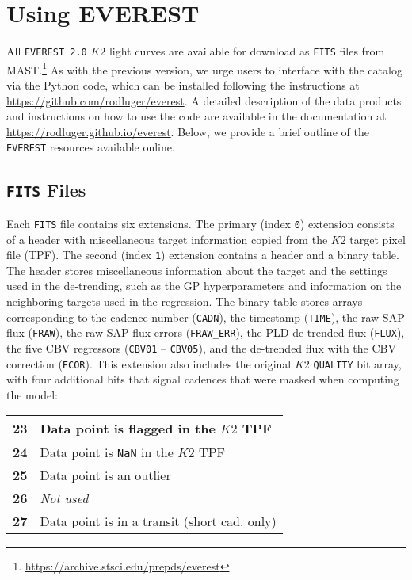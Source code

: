 \documentclass[]{emulateapj}
\newcommand{\edited}[1]{{\color{red} #1}}
\begin{document}
\section{Using EVEREST}
\label{sec:using}
All \texttt{EVEREST 2.0} $K2$ light curves are available for download as \texttt{FITS} files
from MAST.\footnote{\url{https://archive.stsci.edu/prepds/everest}} As with the
previous version, we urge users to interface with the catalog via the Python code,
which can be installed following the instructions at
\url{https://github.com/rodluger/everest}. \edited{A detailed description of the data products
and instructions on how to use the code are available in the documentation at
\url{https://rodluger.github.io/everest}.} Below, we provide
a brief outline of the \texttt{EVEREST} resources available online.

\subsection{\texttt{FITS} Files}
\label{sec:fits}
Each \texttt{FITS} file contains six extensions. The primary (index \texttt{0})
extension consists of a header with miscellaneous target information copied from
the $K2$ target pixel file (TPF). The second (index \texttt{1}) extension contains
a header and a binary table. The header stores miscellaneous
information about the target and the settings used in the de-trending, such as the
GP hyperparameters and information on the neighboring targets used in the regression.
The binary table stores arrays corresponding to the cadence number (\texttt{CADN}),
the timestamp (\texttt{TIME}), the raw SAP flux (\texttt{FRAW}), the raw SAP flux errors
(\texttt{FRAW\_ERR}), the PLD-de-trended flux (\texttt{FLUX}), the five CBV regressors
(\texttt{CBV01} -- \texttt{CBV05}), and the de-trended flux with the CBV
correction (\texttt{FCOR}). This extension also includes the
original $K2$ \texttt{QUALITY} bit array, with four additional bits that signal
cadences that were masked when computing the model:
%
\begin{center}
\begin{tabular}{ |l|l| }
  \hline
  \textbf{23} & Data point is flagged in the $K2$ TPF \\
  \hline
  \textbf{24} & Data point is \texttt{NaN} in the $K2$ TPF \\
  \hline
  \textbf{25} & Data point is an outlier \\
  \hline
  \textbf{26} & \emph{Not used} \\
  \hline
  \textbf{27} & Data point is in a transit (short cad. only) \\
  \hline
\end{tabular}
\end{center}
\end{document}
